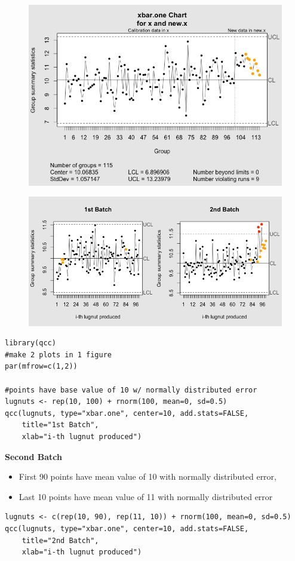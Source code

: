\documentclass[]{article}
\begin{document}
\begin{figure}[h!]
\centering
\includegraphics[width=0.9\linewidth]{./qcc-yhatexample}
\caption{}
\label{fig:qcc-yhatexample}
\end{figure}
\bigskip
\newpage
\begin{figure}[h!]
\centering
\includegraphics[width=0.90\linewidth]{./qcc_lugnuts1}

\label{fig:qcc_lugnuts1}
\end{figure}
\begin{framed}
\begin{verbatim}
library(qcc)
#make 2 plots in 1 figure
par(mfrow=c(1,2))
 
#points have base value of 10 w/ normally distributed error
lugnuts <- rep(10, 100) + rnorm(100, mean=0, sd=0.5)
qcc(lugnuts, type="xbar.one", center=10, add.stats=FALSE,
    title="1st Batch", 
    xlab="i-th lugnut produced")
\end{verbatim}
\end{framed} 
{
\large
\textbf{Second Batch }
\begin{itemize}
\item First 90 points have mean value of 10 with normally distributed error,
\item Last 10 points have mean value of 11 with normally distributed error
\end{itemize}
}
\begin{framed}
\begin{verbatim}
lugnuts <- c(rep(10, 90), rep(11, 10)) + rnorm(100, mean=0, sd=0.5)
qcc(lugnuts, type="xbar.one", center=10, add.stats=FALSE,
    title="2nd Batch", 
    xlab="i-th lugnut produced")
 
\end{verbatim}
\end{framed}
\newpage 
\end{document}
